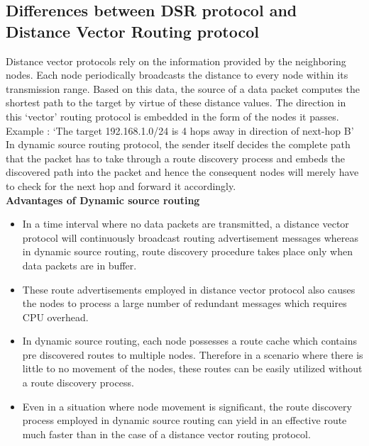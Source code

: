 \documentclass[a4paper,11pt]{article}%
\begin{document}
\subsection{Differences between DSR protocol  and Distance Vector Routing protocol}

Distance vector protocols rely on the information provided by the neighboring nodes. Each node periodically broadcasts the distance to every node within its transmission range. Based on this data, the source of a data packet computes the shortest path to the target by virtue of these distance values. The direction in this ‘vector’ routing protocol is embedded in the form of the nodes it passes\cite{dsr1}\cite{dsr2}.\\

Example : ‘The target 192.168.1.0/24 is 4 hops away in direction of next-hop B’\\

In dynamic source routing protocol, the sender itself decides the complete path that the packet has to take through a route discovery process and embeds the discovered path into the packet and hence the consequent nodes will merely have to check for the next hop and forward it accordingly.\\

\textbf{Advantages of Dynamic source routing}

\begin{itemize}
	\item In a time interval where no data packets are transmitted, a distance vector protocol will continuously broadcast routing advertisement messages whereas in dynamic source routing, route discovery procedure takes place only when data packets are in buffer.
\item These route advertisements employed in distance vector protocol also causes the nodes to process a large number of redundant messages which requires CPU overhead.
\item In dynamic source routing, each node possesses a route cache which contains pre discovered routes to multiple nodes. Therefore in a scenario where there is little to no movement of the nodes, these routes can be easily utilized without a route discovery process.
\item Even in a situation where node movement is significant, the route discovery process employed in dynamic source routing can yield in an effective route much faster than in the case of a distance vector routing protocol.

\end{itemize}



\pagebreak



\end{document}
